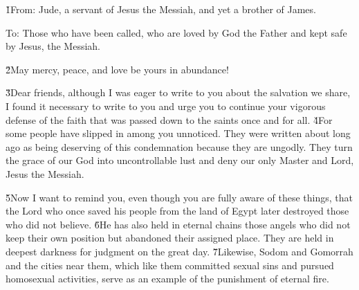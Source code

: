 


\v{1}From: Jude, a servant of Jesus the Messiah, and yet a brother of James.

To: Those who have been called, who are loved by God the Father and kept safe by Jesus, the Messiah.

\v{2}May mercy, peace, and love be yours in abundance!

\v{3}Dear friends, although I was eager to write to you about the salvation we share, I found it necessary to write to you and urge you to continue your vigorous defense of the faith that was passed down to the saints once and for all. \v{4}For some people have slipped in among you unnoticed. They were written about long ago as being deserving of this condemnation because they are ungodly. They turn the grace of our God into uncontrollable lust and deny our only Master and Lord, Jesus the Messiah.

\v{5}Now I want to remind you, even though you are fully aware of these things, that the Lord who once saved his people from the land of Egypt later destroyed those who did not believe. \v{6}He has also held in eternal chains those angels who did not keep their own position but abandoned their assigned place. They are held in deepest darkness for judgment on the great day. \v{7}Likewise, Sodom and Gomorrah and the cities near them, which like them committed sexual sins and pursued homosexual activities, serve as an example of the punishment of eternal fire.

